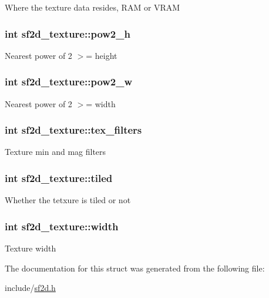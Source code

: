 Where the texture data resides, R\-A\-M or V\-R\-A\-M \hypertarget{structsf2d__texture_a644c43b5fde6e12c8f1e3cb0280798e1}{
\subsubsection[{pow2\-\_\-h}]{\setlength{\rightskip}{0pt plus 5cm}int sf2d\-\_\-texture\-::pow2\-\_\-h}}\label{structsf2d__texture_a644c43b5fde6e12c8f1e3cb0280798e1}
Nearest power of 2 $>$= height \hypertarget{structsf2d__texture_aa1c5388828ad6d18ea37eb2e6ace7f48}{
\subsubsection[{pow2\-\_\-w}]{\setlength{\rightskip}{0pt plus 5cm}int sf2d\-\_\-texture\-::pow2\-\_\-w}}\label{structsf2d__texture_aa1c5388828ad6d18ea37eb2e6ace7f48}
Nearest power of 2 $>$= width \hypertarget{structsf2d__texture_a5274643f191bc4e497c445a5cf12e6b5}{
\subsubsection[{tex\-\_\-filters}]{\setlength{\rightskip}{0pt plus 5cm}int sf2d\-\_\-texture\-::tex\-\_\-filters}}\label{structsf2d__texture_a5274643f191bc4e497c445a5cf12e6b5}
Texture min and mag filters \hypertarget{structsf2d__texture_a4a66a4712612cc5e3f5cdff7d0e604ec}{
\subsubsection[{tiled}]{\setlength{\rightskip}{0pt plus 5cm}int sf2d\-\_\-texture\-::tiled}}\label{structsf2d__texture_a4a66a4712612cc5e3f5cdff7d0e604ec}
Whether the tetxure is tiled or not \hypertarget{structsf2d__texture_a312abd0ee8ab587825804132c136b253}{
\subsubsection[{width}]{\setlength{\rightskip}{0pt plus 5cm}int sf2d\-\_\-texture\-::width}}\label{structsf2d__texture_a312abd0ee8ab587825804132c136b253}
Texture width 

The documentation for this struct was generated from the following file\-:\begin{DoxyCompactItemize}
\item 
include/\hyperlink{sf2d_8h}{sf2d.\-h}\end{DoxyCompactItemize}
